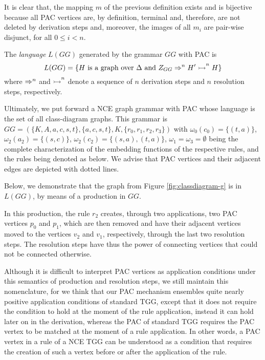 It is clear that, the mapping $m$ of the previous definition exists and is bijective because all PAC vertices are, by definition, terminal and, therefore, are not deleted by derivation steps and, moreover, the images of all $m_i$ are pair-wise disjunct, for all $0 \le i < n$.

\begin{definition}
	The \emph{language} $L(GG)$ generated by the grammar $GG$ with PAC is
	\begin{equation*}
		L(GG) = \{ H \text{ is a graph over } \Delta \text{ and } Z_{GG} \Rightarrow^{n}_{} H' \overset{}{\rightarrowtail}^{n} H \}
	\end{equation*}
	where $\Rightarrow^{n}_{}$ and $\overset{}{\rightarrowtail}^{n}$ denote a sequence of $n$ derivation steps and $n$ resolution steps, respectively.
\end{definition}

Ultimately, we put forward a NCE graph grammar with PAC whose language is the set of all class-diagram graphs. This grammar is $GG = (\{K, A, a, c, s, t\}, \{a, c, s, t\}, K, \{r_0, r_1, r_2, r_3\})$ with $\omega_0(c_0) = \{(t,a)\}$, $\omega_2(a_2) = \{(s,c)\}$, $\omega_2(c_2) = \{(s,a),(t,a)\}$, $\omega_1 = \omega_3 = \emptyset$ being the complete characterization of the embedding functions of the respective rules, and the rules being denoted as below. We advise that PAC vertices and their adjacent edges are depicted with dotted lines.



Below, we demonstrate that the graph from Figure \ref{fig:classdiagram-g} is in $L(GG)$, by means of a production in $GG$.



In this production, the rule $r_2$ creates, through two applications, two PAC vertices $p_0$ and $p_1$, which are then removed and have their adjacent vertices moved to the vertices $v_2$ and $v_1$, respectively, through the last two resolution steps. The resolution steps have thus the power of connecting vertices that could not be connected otherwise.

Although it is difficult to interpret PAC vertices as application conditions under this semantics of production and resolution steps, we still maintain this nomenclature, for we think that our PAC mechanism ensembles quite nearly positive application conditions of standard TGG, except that it does not require the condition to hold at the moment of the rule application, instead it can hold later on in the derivation, whereas the PAC of standard TGG requires the PAC vertex to be matched at the moment of a rule application. In other words, a PAC vertex in a rule of a NCE TGG can be understood as a condition that requires the creation of such a vertex before or after the application of the rule.

